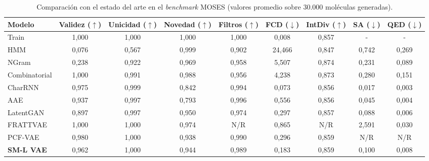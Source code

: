 \begin{table}[htbp]
\centering
\caption{Comparación con el estado del arte en el \textit{benchmark} MOSES (valores promedio sobre 30.000 moléculas generadas).}
\label{tab:resultados_reducidos}
\begin{tabular}{l c c c c c c c c}
\toprule
Modelo & Validez ($\uparrow$) & Unicidad ($\uparrow$) & Novedad ($\uparrow$) & Filtros ($\uparrow$) & FCD ($\downarrow$) & IntDiv ($\uparrow$) & SA ($\downarrow$) & QED ($\downarrow$) \\
\midrule
Train & 1,000 & 1,000 & 1,000 & 1,000 & 0,008 & 0,857 & - & - \\
HMM & 0,076 & 0,567 & 0,999 & 0,902 & 24,466 & 0,847 & 0,742 & 0,269 \\
NGram & 0,238 & 0,922 & 0,969 & 0,958 & 5,507 & 0,874 & 0,231 & 0,089 \\
Combinatorial & 1,000 & 0,991 & 0,988 & 0,956 & 4,238 & 0,873 & 0,280 & 0,151 \\
CharRNN & 0,975 & 0,999 & 0,842 & 0,994 & 0,073 & 0,856 & 0,017 & 0,003 \\
AAE & 0,937 & 0,997 & 0,793 & 0,996 & 0,556 & 0,856 & 0,045 & 0,004 \\
LatentGAN & 0,897 & 0,997 & 0,950 & 0,974 & 0,297 & 0,857 & 0,088 & 0,006 \\
FRATTVAE & 1,000 & 1,000 & 0,974 & N/R & 0,865 & N/R & 2,591 & 0,030 \\
PCF-VAE & 0,980 & 1,000 & 0,938 & 0,990 & 0,296 & 0,859 & N/R & N/R \\
\textbf{SM-L VAE} & 0,962 & 1,000 & 0,944 & 0,989 & 0,183 & 0,859 & 0,100 & 0,008 \\
\bottomrule
\end{tabular}
\end{table}
